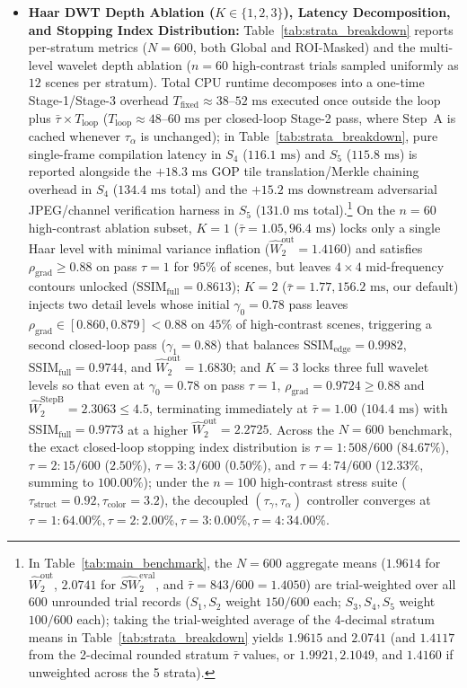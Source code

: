 \documentclass[conference,10pt]{IEEEtran}
\begin{document}
\begin{itemize}
    \item \textbf{Haar DWT Depth Ablation ($K \in \{1, 2, 3\}$), Latency Decomposition, and Stopping Index Distribution:} Table~\ref{tab:strata_breakdown} reports per-stratum metrics ($N=600$, both Global and ROI-Masked) and the multi-level wavelet depth ablation ($n=60$ high-contrast trials sampled uniformly as $12$ scenes per stratum). Total CPU runtime decomposes into a one-time Stage-1/Stage-3 overhead $T_{\text{fixed}} \approx 38\text{--}52\text{ ms}$ executed once outside the loop plus $\bar{\tau} \times T_{\text{loop}}$ ($T_{\text{loop}} \approx 48\text{--}60\text{ ms}$ per closed-loop Stage-2 pass, where Step~A is cached whenever $\tau_\alpha$ is unchanged); in Table~\ref{tab:strata_breakdown}, pure single-frame compilation latency in $S_4$ ($116.1\text{ ms}$) and $S_5$ ($115.8\text{ ms}$) is reported alongside the $+18.3\text{ ms}$ GOP tile translation/Merkle chaining overhead in $S_4$ ($134.4\text{ ms}$ total) and the $+15.2\text{ ms}$ downstream adversarial JPEG/channel verification harness in $S_5$ ($131.0\text{ ms}$ total).\footnote{In Table~\ref{tab:main_benchmark}, the $N=600$ aggregate means ($1.9614$ for $\widehat{W}_2^{\text{out}}$, $2.0741$ for $\widehat{SW}_2^{\text{eval}}$, and $\bar{\tau} = 843/600 = 1.4050$) are trial-weighted over all $600$ unrounded trial records ($S_1, S_2$ weight $150/600$ each; $S_3, S_4, S_5$ weight $100/600$ each); taking the trial-weighted average of the 4-decimal stratum means in Table~\ref{tab:strata_breakdown} yields $1.9615$ and $2.0741$ (and $1.4117$ from the 2-decimal rounded stratum $\bar{\tau}$ values, or $1.9921, 2.1049$, and $1.4160$ if unweighted across the 5 strata).} On the $n=60$ high-contrast ablation subset, $K=1$ ($\bar{\tau} = 1.05, 96.4\text{ ms}$) locks only a single Haar level with minimal variance inflation ($\widehat{W}_2^{\text{out}} = 1.4160$) and satisfies $\rho_{\text{grad}} \ge 0.88$ on pass $\tau=1$ for $95\%$ of scenes, but leaves $4\times 4$ mid-frequency contours unlocked ($\mathrm{SSIM}_{\text{full}} = 0.8613$); $K=2$ ($\bar{\tau} = 1.77, 156.2\text{ ms}$, our default) injects two detail levels whose initial $\gamma_0 = 0.78$ pass leaves $\rho_{\text{grad}} \in [0.860, 0.879] < 0.88$ on $45\%$ of high-contrast scenes, triggering a second closed-loop pass ($\gamma_1 = 0.88$) that balances $\mathrm{SSIM}_{\text{edge}} = 0.9982$, $\mathrm{SSIM}_{\text{full}} = 0.9744$, and $\widehat{W}_2^{\text{out}} = 1.6830$; and $K=3$ locks three full wavelet levels so that even at $\gamma_0 = 0.78$ on pass $\tau=1$, $\rho_{\text{grad}} = 0.9724 \ge 0.88$ and $\widehat{W}_2^{\text{StepB}} = 2.3063 \le 4.5$, terminating immediately at $\bar{\tau} = 1.00$ ($104.4\text{ ms}$) with $\mathrm{SSIM}_{\text{full}} = 0.9773$ at a higher $\widehat{W}_2^{\text{out}} = 2.2725$. Across the $N=600$ benchmark, the exact closed-loop stopping index distribution is $\tau=1: 508/600$ ($84.67\%$), $\tau=2: 15/600$ ($2.50\%$), $\tau=3: 3/600$ ($0.50\%$), and $\tau=4: 74/600$ ($12.33\%$, summing to $100.00\%$); under the $n=100$ high-contrast stress suite ($\tau_{\text{struct}}=0.92, \tau_{\text{color}}=3.2$), the decoupled $(\tau_\gamma, \tau_\alpha)$ controller converges at $\tau=1: 64.00\%, \tau=2: 2.00\%, \tau=3: 0.00\%, \tau=4: 34.00\%$.

\end{itemize}
\end{document}
